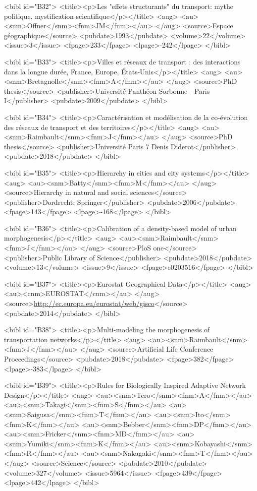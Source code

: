 \documentclass{bmcart}
\begin{document}
\begin{backmatter}
{<bibl id="B32">
  <title><p>Les "effets structurants" du transport: mythe politique,
  mystification scientifique</p></title>
  <aug>
    <au><snm>Offner</snm><fnm>JM</fnm></au>
  </aug>
  <source>Espace g{\'e}ographique</source>
  <pubdate>1993</pubdate>
  <volume>22</volume>
  <issue>3</issue>
  <fpage>233</fpage>
  <lpage>-242</lpage>
</bibl>

<bibl id="B33">
  <title><p>{Villes et r{\'e}seaux de transport : des interactions dans la
  longue dur{\'e}e, France, Europe, {\'E}tats-Unis}</p></title>
  <aug>
    <au><snm>Bretagnolle</snm><fnm>A</fnm></au>
  </aug>
  <source>PhD thesis</source>
  <publisher>Universit{\'e} Panth{\'e}on-Sorbonne - Paris I</publisher>
  <pubdate>2009</pubdate>
</bibl>

<bibl id="B34">
  <title><p>Caract{\'e}risation et mod{\'e}lisation de la co-{\'e}volution des
  r{\'e}seaux de transport et des territoires</p></title>
  <aug>
    <au><snm>Raimbault</snm><fnm>J</fnm></au>
  </aug>
  <source>PhD thesis</source>
  <publisher>Universit{\'e} Paris 7 Denis Diderot</publisher>
  <pubdate>2018</pubdate>
</bibl>

<bibl id="B35">
  <title><p>Hierarchy in cities and city systems</p></title>
  <aug>
    <au><snm>Batty</snm><fnm>M</fnm></au>
  </aug>
  <source>Hierarchy in natural and social sciences</source>
  <publisher>Dordrecht: Springer</publisher>
  <pubdate>2006</pubdate>
  <fpage>143</fpage>
  <lpage>-168</lpage>
</bibl>

<bibl id="B36">
  <title><p>Calibration of a density-based model of urban
  morphogenesis</p></title>
  <aug>
    <au><snm>Raimbault</snm><fnm>J</fnm></au>
  </aug>
  <source>PloS one</source>
  <publisher>Public Library of Science</publisher>
  <pubdate>2018</pubdate>
  <volume>13</volume>
  <issue>9</issue>
  <fpage>e0203516</fpage>
</bibl>

<bibl id="B37">
  <title><p>Eurostat Geographical Data</p></title>
  <aug>
    <au><cnm>EUROSTAT</cnm></au>
  </aug>
  <source>\url{http://ec.europa.eu/eurostat/web/gisco}</source>
  <pubdate>2014</pubdate>
</bibl>

<bibl id="B38">
  <title><p>Multi-modeling the morphogenesis of transportation
  networks</p></title>
  <aug>
    <au><snm>Raimbault</snm><fnm>J</fnm></au>
  </aug>
  <source>Artificial Life Conference Proceedings</source>
  <pubdate>2018</pubdate>
  <fpage>382</fpage>
  <lpage>-383</lpage>
</bibl>

<bibl id="B39">
  <title><p>Rules for Biologically Inspired Adaptive Network Design</p></title>
  <aug>
    <au><snm>Tero</snm><fnm>A</fnm></au>
    <au><snm>Takagi</snm><fnm>S</fnm></au>
    <au><snm>Saigusa</snm><fnm>T</fnm></au>
    <au><snm>Ito</snm><fnm>K</fnm></au>
    <au><snm>Bebber</snm><fnm>DP</fnm></au>
    <au><snm>Fricker</snm><fnm>MD</fnm></au>
    <au><snm>Yumiki</snm><fnm>K</fnm></au>
    <au><snm>Kobayashi</snm><fnm>R</fnm></au>
    <au><snm>Nakagaki</snm><fnm>T</fnm></au>
  </aug>
  <source>Science</source>
  <pubdate>2010</pubdate>
  <volume>327</volume>
  <issue>5964</issue>
  <fpage>439</fpage>
  <lpage>442</lpage>
</bibl>

}
\end{backmatter}
\end{document}

